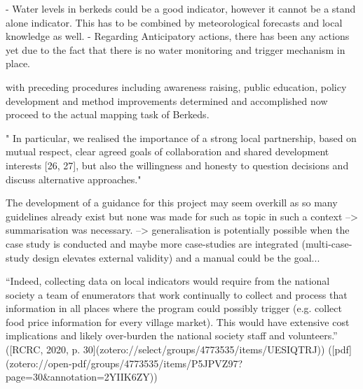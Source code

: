 


-	Water levels in berkeds could be a good indicator, however it cannot be a stand alone indicator. This has to be combined by meteorological forecasts and local knowledge as well.
- Regarding Anticipatory actions, there has been any actions yet due to the fact that there is no water monitoring and trigger mechanism in place.



with preceding procedures including awareness raising, public education, policy development and method improvements determined and accomplished now proceed to the actual mapping task of Berkeds.


" In particular, we realised the importance of a strong local partnership, based on mutual respect, clear agreed goals of collaboration and shared development interests [26, 27], but also the willingness and honesty to question decisions and discuss alternative approaches."

The development of a guidance for this project may seem overkill as so many guidelines already exist but none was made for such as topic in such a context --> summarisation was necessary. --> generalisation is potentially possible when the case study is conducted and maybe more case-studies are integrated (multi-case-study design elevates external validity) and a manual could be the goal... 



“Indeed, collecting data on local indicators would require from the national society a team of enumerators that work continually to collect and process that information in all places where the program could possibly trigger (e.g. collect food price information for every village market). This would have extensive cost implications and likely over-burden the national society staff and volunteers.” ([RCRC, 2020, p. 30](zotero://select/groups/4773535/items/UESIQTRJ)) ([pdf](zotero://open-pdf/groups/4773535/items/P5JPVZ97?page=30&annotation=2YIIK6ZY))

